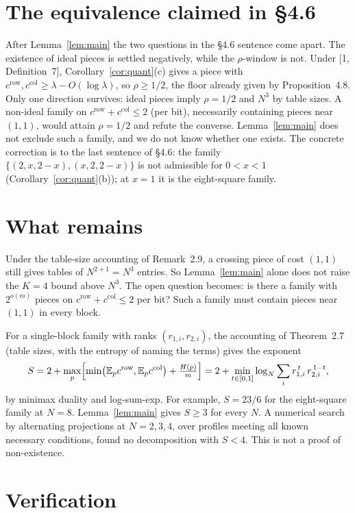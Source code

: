 \documentclass[11pt]{article}
\theoremstyle{remark}
\begin{document}
\section{The equivalence claimed in \S4.6}

After Lemma~\ref{lem:main} the two questions in the \S4.6 sentence come apart.
The existence of ideal pieces is settled negatively, while the $\rho$-window is not.
Under [1, Definition~7], Corollary~\ref{cor:quant}(c) gives a piece with $c^{\mathrm{row}},c^{\mathrm{col}}\ge\lambda-O(\log\lambda)$, so $\rho\ge 1/2$, the floor already given by Proposition~4.8.
Only one direction survives: ideal pieces imply $\rho=1/2$ and $N^3$ by table sizes.
A non-ideal family on $c^{\mathrm{row}}+c^{\mathrm{col}}\le 2$ (per bit), necessarily containing pieces near $(1,1)$, would attain $\rho=1/2$ and refute the converse.
Lemma~\ref{lem:main} does not exclude such a family, and we do not know whether one exists.
The concrete correction is to the last sentence of \S4.6: the family $\{(2,x,2-x),(x,2,2-x)\}$ is not admissible for $0<x<1$ (Corollary~\ref{cor:quant}(b)); at $x=1$ it is the eight-square family.

\section{What remains}

Under the table-size accounting of Remark~2.9, a crossing piece of cost $(1,1)$ still gives tables of $N^{2+1}=N^3$ entries.
So Lemma~\ref{lem:main} alone does not raise the $K=4$ bound above $N^3$.
The open question becomes: is there a family with $2^{o(m)}$ pieces on $c^{\mathrm{row}}+c^{\mathrm{col}}\le 2$ per bit?
Such a family must contain pieces near $(1,1)$ in every block.

For a single-block family with ranks $(r_{1,i},r_{2,i})$, the accounting of Theorem~2.7 (table sizes, with the entropy of naming the terms) gives the exponent
\[
S=2+\max_p\Bigl[\min\bigl(\mathbb{E}_p c^{\mathrm{row}},\mathbb{E}_p c^{\mathrm{col}}\bigr)+\tfrac{H(p)}{m}\Bigr]
 =2+\min_{t\in[0,1]}\log_N\sum_i r_{1,i}^{\,t}\,r_{2,i}^{\,1-t},
\]
by minimax duality and log-sum-exp.
For example, $S=23/6$ for the eight-square family at $N=8$.
Lemma~\ref{lem:main} gives $S\ge 3$ for every $N$.
A numerical search by alternating projections at $N=2,3,4$, over profiles meeting all known necessary conditions, found no decomposition with $S<4$. This is not a proof of non-existence.

\section{Verification}
\end{document}
